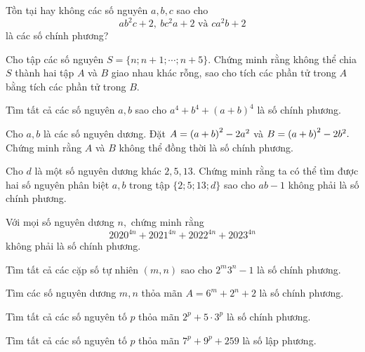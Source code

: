 \begin{btt}
Tồn tại hay không các số nguyên $a,b,c$ sao cho $$ab^2c+2,\: bc^2a+2\text{ và }ca^2b+2$$
là các số chính phương?
\end{btt}

\begin{btt}
Cho tập các số nguyên $S=\{n;n+1;\cdots;n+5\}.$ Chứng minh rằng không thể chia $S$ thành hai tập $A$ và $B$ giao nhau khác rỗng, sao cho tích các phần tử trong $A$ bằng tích các phần tử trong $B.$
\end{btt}

\begin{btt}
Tìm tất cả các số nguyên $a,b$ sao cho $a^4+b^4+(a+b)^4$ là số chính phương.
\end{btt}

\begin{btt}
Cho $a,b$ là các số nguyên dương. Đặt $A=\left(\displaystyle a+b \right)^2-2a^2$ và $B=\left(\displaystyle a+b \right)^2-2b^2.$ Chứng minh rằng $A$ và $B$ không thể đồng thời là số chính phương.
\end{btt}

\begin{btt}
Cho $d$ là một số nguyên dương khác $2,5,13.$ Chứng minh rằng ta có thể tìm được hai số nguyên phân biệt $a,b$ trong tập $\{2;5;13;d\}$ sao cho $ab-1$ không phải là số chính phương.
\end{btt}

\begin{btt}
Với mọi số nguyên dương $n,$ chứng minh rằng $$2020^{4n}+2021^{4n}+2022^{4n}+2023^{4n}$$ không phải là số chính phương.
\end{btt}

\begin{btt}
Tìm tất cả các cặp số tự nhiên $(m,n)$ sao cho $2^m3^n-1$ là số chính phương.
\end{btt}

\begin{btt}
Tìm các số nguyên dương $m,n$ thỏa mãn $A=6^m+2^n+2$ là số chính phương.
\end{btt}

\begin{btt}
Tìm tất cả các số nguyên tố $p$ thỏa mãn $2^p+5\cdot 3^p$ là số chính phương.
\end{btt}

\begin{btt}
Tìm tất cả các số nguyên tố $p$ thỏa mãn $7^p+9^p+259$ là số lập phương.

\end{btt}

